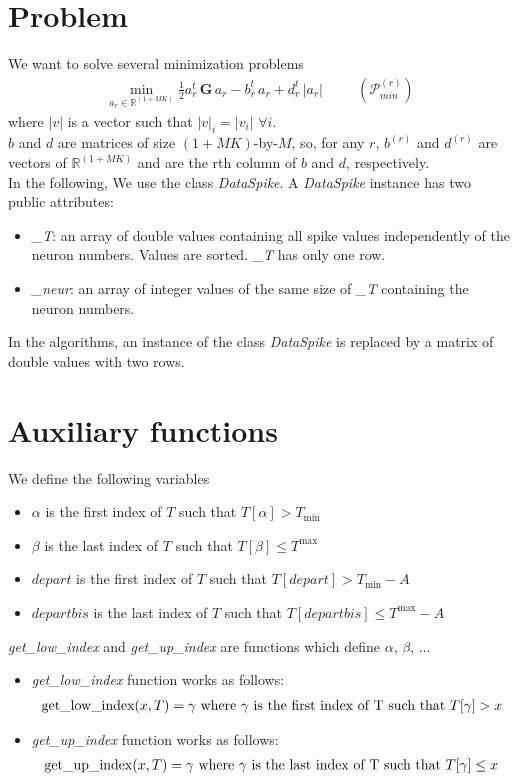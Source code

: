 \documentclass{article}
\newcommand{\be}{\begin{eqnarray*}}
\newcommand{\ee}{\end{eqnarray*}}
\newcommand{\dsp}{\displaystyle}
\def\R{\mathbb{R}}
\def\Tmin{T_{\min}}
\def\Tmax{T^{\max}}
\begin{document}
\section{Problem}
We want to solve several minimization problems
\be
\min_{a_r\in\R^{(1+MK)}} \dsp\frac{1}{2}a_r^t\,\mathbf{G}\,a_r-b_r^t\,a_r+d_r^t\,|a_r| \ \ \quad \quad (\mathcal{P}_{min}^{(r)})
\ee
where $|v|$ is a vector such that $|v|_i=|v_i|\, \, \forall i$.\\
$b$ and $d$ are matrices of size $(1+MK)$-by-$M$, so, for any $r$, $b^{(r)}$ and $d^{(r)}$ are vectors of $\R^{(1+MK)}$ and are the rth column of $b$ and $d$, respectively.\\
In the following, We use the class \textit{DataSpike}. A \textit{DataSpike} instance has two public attributes:
\begin{itemize}
\item \textit{\_T}: an array of double values containing all spike values independently of the neuron numbers. Values are sorted. \textit{\_T} has only one row.
\item \textit{\_neur}: an array of integer values of the same size of \textit{\_T} containing the neuron numbers.
\end{itemize}
In the algorithms, an instance of the class \textit{DataSpike} is replaced by a matrix of double values with two rows.

\section{Auxiliary functions}
We define the following variables
\begin{itemize}
\item $\alpha$ is the first index of $T$ such that $T[\alpha]> \Tmin$
\item $\beta$ is the last index of $T$ such that $T[\beta]\leq \Tmax$
\item $depart$ is the first index of $T$ such that $T[depart]> \Tmin-A$
\item $departbis$ is the last index of $T$ such that $T[departbis]\leq \Tmax-A$
\end{itemize}
\textit{get\_low\_index} and \textit{get\_up\_index} are functions which define $\alpha$, $\beta$, ...
\begin{itemize}
\item \textit{get\_low\_index} function works as follows:
\be
\hbox{get\_low\_index}(x, T) = \gamma \hbox{ where } \gamma \hbox{ is the first index of T such that }T[\gamma]> x 
\ee
\item \textit{get\_up\_index} function works as follows:
\be
\hbox{get\_up\_index}(x, T) = \gamma \hbox{ where } \gamma \hbox{ is the last index of T such that }T[\gamma]\leq x 
\ee
\end{itemize}
\end{document}
